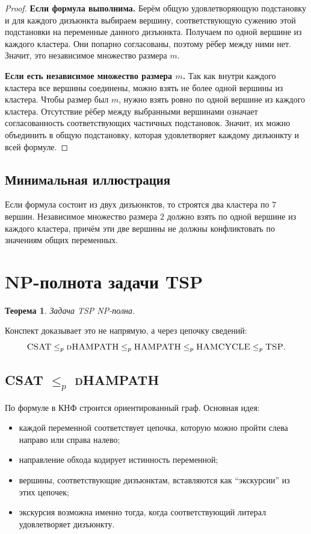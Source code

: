 \documentclass[12pt,a4paper]{article}
\theoremstyle{definition}
\theoremstyle{plain}
\newtheorem{theorem}{Теорема}[section]
\begin{document}
\begin{proof}
\textbf{Если формула выполнима.}
Берём общую удовлетворяющую подстановку и для каждого дизъюнкта выбираем вершину, соответствующую сужению этой подстановки на переменные данного дизъюнкта. Получаем по одной вершине из каждого кластера. Они попарно согласованы, поэтому рёбер между ними нет. Значит, это независимое множество размера $m$.

\medskip
\noindent
\textbf{Если есть независимое множество размера $m$.}
Так как внутри каждого кластера все вершины соединены, можно взять не более одной вершины из кластера. Чтобы размер был $m$, нужно взять ровно по одной вершине из каждого кластера. Отсутствие рёбер между выбранными вершинами означает согласованность соответствующих частичных подстановок. Значит, их можно объединить в общую подстановку, которая удовлетворяет каждому дизъюнкту и всей формуле.
\end{proof}

\subsection{Минимальная иллюстрация}
Если формула состоит из двух дизъюнктов, то строятся два кластера по $7$ вершин. Независимое множество размера $2$ должно взять по одной вершине из каждого кластера, причём эти две вершины не должны конфликтовать по значениям общих переменных.

\section{NP-полнота задачи \texorpdfstring{\textsc{TSP}}{TSP}}

\begin{theorem}
Задача \textsc{TSP} NP-полна.
\end{theorem}

Конспект доказывает это не напрямую, а через цепочку сведений:
\[
\textsc{CSAT}\le_p \textsc{dHAMPATH}\le_p \textsc{HAMPATH}\le_p \textsc{HAMCYCLE}\le_p \textsc{TSP}.
\]

\subsection{\textsc{CSAT} \texorpdfstring{$\le_p$}{<=p} \textsc{dHAMPATH}}
По формуле в КНФ строится ориентированный граф. Основная идея:
\begin{itemize}
\item каждой переменной соответствует цепочка, которую можно пройти слева направо или справа налево;
\item направление обхода кодирует истинность переменной;
\item вершины, соответствующие дизъюнктам, вставляются как ``экскурсии'' из этих цепочек;
\item экскурсия возможна именно тогда, когда соответствующий литерал удовлетворяет дизъюнкту.
\end{itemize}
\end{document}
